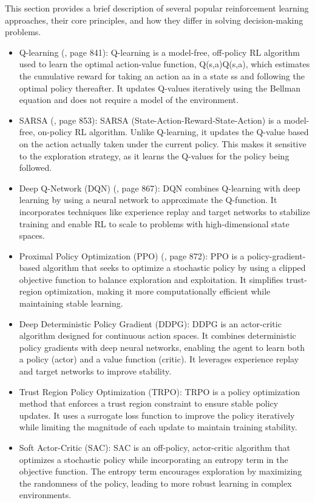 This section provides a brief description of several popular reinforcement learning approaches, their core principles, and how they differ in solving decision-making problems.
\begin{itemize}
    \item Q-learning (\cite{rn2022aima}, page 841): Q-learning is a model-free, off-policy RL algorithm used to learn the optimal action-value function, Q(s,a)Q(s,a), which estimates the cumulative reward for taking an action aa in a state ss and following the optimal policy thereafter. It updates Q-values iteratively using the Bellman equation and does not require a model of the environment.
    \item SARSA (\cite{rn2022aima}, page 853): SARSA (State-Action-Reward-State-Action) is a model-free, on-policy RL algorithm. Unlike Q-learning, it updates the Q-value based on the action actually taken under the current policy. This makes it sensitive to the exploration strategy, as it learns the Q-values for the policy being followed.
    \item Deep Q-Network (DQN) (\cite{rn2022aima}, page 867): DQN combines Q-learning with deep learning by using a neural network to approximate the Q-function. It incorporates techniques like experience replay and target networks to stabilize training and enable RL to scale to problems with high-dimensional state spaces.
    \item Proximal Policy Optimization (PPO) (\cite{rn2022aima}, page 872): PPO is a policy-gradient-based algorithm that seeks to optimize a stochastic policy by using a clipped objective function to balance exploration and exploitation. It simplifies trust-region optimization, making it more computationally efficient while maintaining stable learning.
    \item Deep Deterministic Policy Gradient (DDPG): DDPG is an actor-critic algorithm designed for continuous action spaces. It combines deterministic policy gradients with deep neural networks, enabling the agent to learn both a policy (actor) and a value function (critic). It leverages experience replay and target networks to improve stability.
    \item Trust Region Policy Optimization (TRPO): TRPO is a policy optimization method that enforces a trust region constraint to ensure stable policy updates. It uses a surrogate loss function to improve the policy iteratively while limiting the magnitude of each update to maintain training stability.
    \item Soft Actor-Critic (SAC): SAC is an off-policy, actor-critic algorithm that optimizes a stochastic policy while incorporating an entropy term in the objective function. The entropy term encourages exploration by maximizing the randomness of the policy, leading to more robust learning in complex environments.
\end{itemize}

